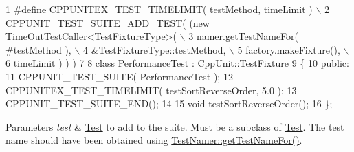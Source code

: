 \begin{DoxyCode}
1 #define CPPUNITEX\_TEST\_TIMELIMIT( testMethod, timeLimit )            \(\backslash\)
2      CPPUNIT\_TEST\_SUITE\_ADD\_TEST( (new TimeOutTestCaller<TestFixtureType>(  \(\backslash\)
3                  namer.getTestNameFor( #testMethod ),                \(\backslash\)
4                  &TestFixtureType::testMethod,                   \(\backslash\)
5                  factory.makeFixture(),                              \(\backslash\)
6                  timeLimit ) ) )
7   
8 class PerformanceTest : CppUnit::TestFixture
9 \{
10 public:
11   CPPUNIT\_TEST\_SUITE( PerformanceTest );
12   CPPUNITEX\_TEST\_TIMELIMIT( testSortReverseOrder, 5.0 );
13   CPPUNIT\_TEST\_SUITE\_END();
14 
15   void testSortReverseOrder();
16 \};
\end{DoxyCode}



\begin{DoxyParams}{Parameters}
{\em test} & \hyperlink{class_test}{Test} to add to the suite. Must be a subclass of \hyperlink{class_test}{Test}. The test name should have been obtained using \hyperlink{class_test_namer_aa56007426b92b4c34bb2e98548419893}{Test\+Namer\+::get\+Test\+Name\+For()}. \\
\hline
\end{DoxyParams}
